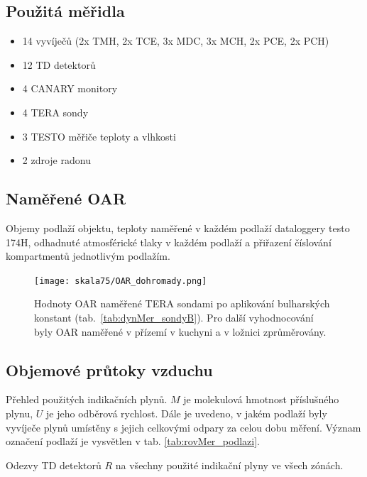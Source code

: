 \subsection{Použitá měřidla}
\begin{itemize}
    \setlength\itemsep{0em}
	\item 14 vyvíječů (2x TMH, 2x TCE, 3x MDC, 3x MCH, 2x PCE, 2x PCH)
	\item 12 TD detektorů
	\item 4 CANARY monitory
	\item 4 TERA sondy
	\item 3 TESTO měřiče teploty a vlhkosti
	\item 2 zdroje radonu
\end{itemize}

\subsection{Naměřené OAR}

\begin{table}[H]
    \centering
    \caption{Objemy podlaží objektu, teploty naměřené v každém podlaží dataloggery testo 174H, odhadnuté atmosférické tlaky v každém podlaží a přiřazení číslování kompartmentů jednotlivým podlažím.}
    \label{tab:skala75_objemy}
    
\end{table}
\begin{figure}[H]
    \centering
    \texttt{[image: skala75/OAR\_dohromady.png]}
    \caption{Hodnoty OAR naměřené TERA sondami po aplikování bulharských konstant (tab.~\ref{tab:dynMer_sondyB}). Pro další vyhodnocování byly OAR naměřené v přízemí v kuchyni a v ložnici zprůměrovány.}
    \label{fig:skala75_OARdohromady}
\end{figure}
\subsection{Objemové průtoky vzduchu}

\begin{table}[H]
    \centering
    \caption{Přehled použitých indikačních plynů. $M$ je molekulová hmotnost příslušného plynu, $U$ je jeho odběrová rychlost. Dále je uvedeno, v jakém podlaží byly vyvíječe plynů umístěny s jejich celkovými odpary za celou dobu měření. Význam označení podlaží je vysvětlen v tab. \ref{tab:rovMer_podlazi}.}
    \label{tab:skala75_indikacniPlyny}
    
\end{table}
\begin{table}[H]
    \centering
    \caption{Odezvy TD detektorů $R$ na všechny použité indikační plyny ve všech zónách.}
    \label{tab:skala75_odezvyTD}
    
\end{table}

